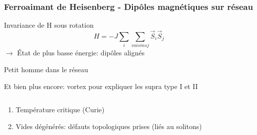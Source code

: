 \documentclass[handout]{beamer}
\begin{document}
\begin{frame}
\frametitle{Ferroaimant de Heisenberg - Dipôles magnétiques sur réseau}
Invariance de H sous rotation\\
\begin{equation*}
H= -J\sum_{i}{\sum_{voisins j}{\vec{S}_i\vec{S}_j}}
\end{equation*} 
$\rightarrow$ État de plus basse énergie: dipôles alignés \\
 \begin{figure}[0.5\textwidth]
 \end{figure}

\end{frame}

\begin{frame}
    \begin{figure}[0.3\textwidth]
    \end{figure}
    Petit homme dans le réseau
    
Et bien plus encore: vortex pour expliquer les supra type I et II
 \end{frame} 

\begin{frame}
\begin{columns}
\begin{column}{.5\linewidth}
    \begin{enumerate}
    \item Température critique (Curie)
    \item Vides dégénérés: défauts topologiques prises (liés au solitons)
    \end{enumerate}
    \end{column}
	\begin{column}{.5\linewidth}
    \begin{figure}[0.3\textwidth]
    \end{figure}
 
	\end{column}
	
\end{columns}
\end{frame}
\end{document}
